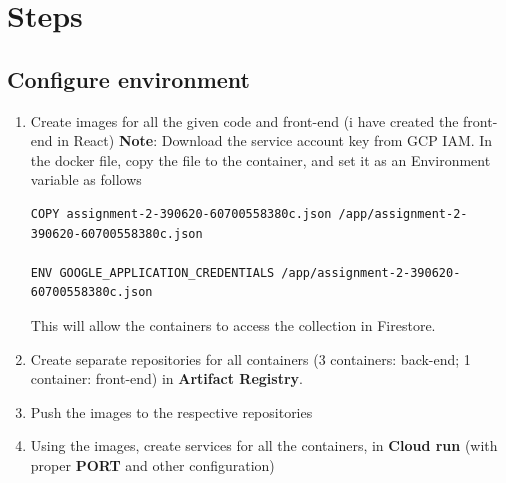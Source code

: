 \section{Steps}
\subsection{Configure environment}

\begin{enumerate}
    \item Create images for all the given code and front-end (i have created the front-end in React)
    \newline
    \textbf{Note}: Download the service account key from GCP IAM. In the docker file, copy the file to the container, and set it as an Environment variable as follows
    



\begin{lstlisting}[caption={Dockerfile Code snippet}]
COPY assignment-2-390620-60700558380c.json /app/assignment-2-390620-60700558380c.json

ENV GOOGLE_APPLICATION_CREDENTIALS /app/assignment-2-390620-60700558380c.json
\end{lstlisting}
    This will allow the containers to access the collection in Firestore.
    \item Create separate repositories for all containers (3 containers: back-end; 1 container: front-end) in \textbf{Artifact Registry}.
    \item Push the images to the respective repositories
    \item Using the images, create services for all the containers, in \textbf{Cloud run} (with proper \textbf{PORT} and other configuration)
\end{enumerate}

